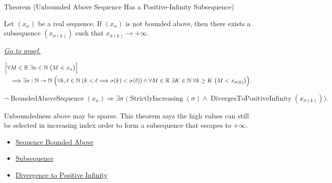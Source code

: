 
\begin{theorembox}{Theorem (Unbounded Above Sequence Has a Positive-Infinity Subsequence)}
\begin{theorem}
\label{thm:unbounded-above-has-positive-infinity-subsequence}
Let $(x_n)$ be a real sequence. If $(x_n)$ is not bounded above, then
there exists a subsequence $(x_{\sigma(k)})$ such that
$x_{\sigma(k)}\to+\infty$.

\smallskip
\noindent
\hyperref[prf:unbounded-above-has-positive-infinity-subsequence]{\textit{Go to proof.}}
\end{theorem}
\end{theorembox}

\begin{remark*}
\[
\begin{aligned}
&\Bigl[
  \forall M\in\mathbb{R}\;\exists n\in\mathbb{N}\;\bigl(M<x_n\bigr)
\Bigr]\\
&\quad\Longrightarrow
\exists \sigma:\mathbb{N}\to\mathbb{N}\;
\Bigl(
  \forall k,\ell\in\mathbb{N}\;(k<\ell\Longrightarrow \sigma(k)<\sigma(\ell))
  \land
  \forall M\in\mathbb{R}\;\exists K\in\mathbb{N}\;\forall k\ge K
  \;\bigl(M<x_{\sigma(k)}\bigr)
\Bigr).
\end{aligned}
\]
\end{remark*}

\begin{remark*}
\[
\neg\operatorname{BoundedAboveSequence}(x_n)
\Longrightarrow
\exists \sigma\;
\bigl(
  \operatorname{StrictlyIncreasing}(\sigma)
  \land
  \operatorname{DivergesToPositiveInfinity}(x_{\sigma(k)})
\bigr).
\]
\end{remark*}

\begin{remark*}[Interpretation]
Unboundedness above may be sparse. This theorem says the high values can
still be selected in increasing index order to form a subsequence that
escapes to $+\infty$.
\end{remark*}

\begin{remark*}[Dependencies]\hfill
\begin{itemize}
  \item \hyperref[def:sequence-bounded-above]{Sequence Bounded Above}
  \item \hyperref[def:subsequence]{Subsequence}
  \item \hyperref[def:diverges-to-positive-infinity]{Divergence to Positive Infinity}
\end{itemize}
\end{remark*}

